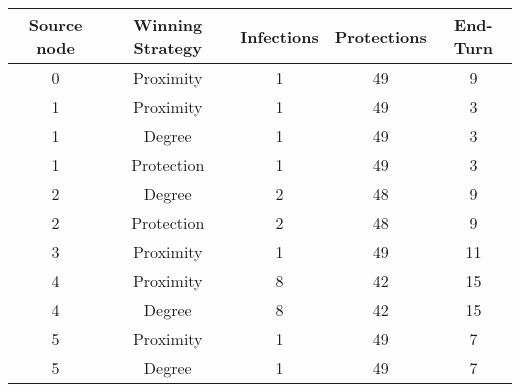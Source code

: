 \documentclass[results.tex]{subfiles}
\begin{document}
    \begin{center}
        \begin{tabular}{| c || c | c | c | c |}
            \hline
            {\bfseries Source node} & {\bfseries Winning Strategy} & {\bfseries Infections} & {\bfseries Protections}
            & {\bfseries End-Turn}
            \\  %
            \hline\hline
            0                       & Proximity                    & 1                      & 49                      & 9                    \\
            \hline
            1                       & Proximity                    & 1                      & 49                      & 3                    \\
            \hline
            1                       & Degree                       & 1                      & 49                      & 3                    \\
            \hline
            1                       & Protection                   & 1                      & 49                      & 3                    \\
            \hline
            2                       & Degree                       & 2                      & 48                      & 9                    \\
            \hline
            2                       & Protection                   & 2                      & 48                      & 9                    \\
            \hline
            3                       & Proximity                    & 1                      & 49                      & 11                   \\
            \hline
            4                       & Proximity                    & 8                      & 42                      & 15                   \\
            \hline
            4                       & Degree                       & 8                      & 42                      & 15                   \\
            \hline
            5                       & Proximity                    & 1                      & 49                      & 7                    \\
            \hline
            5                       & Degree                       & 1                      & 49                      & 7                    \\

\end{tabular}
\end{center}
\end{document}
